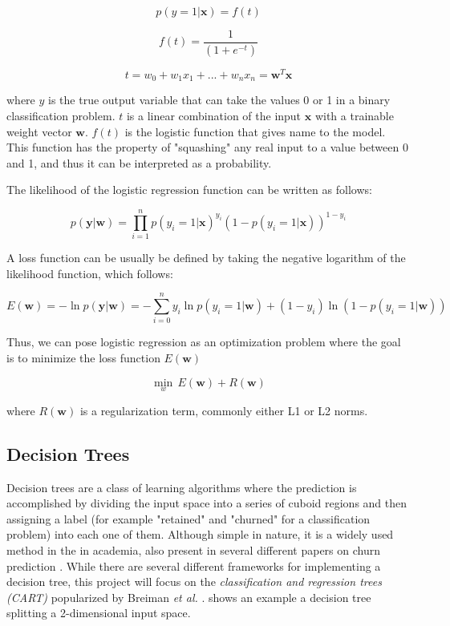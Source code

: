 \documentclass{kththesis}
\begin{document}
\begin{equation}
p(y = 1|\mathbf{x}) = f(t)
\end{equation}

\begin{equation}
f(t) = \frac{1}{(1+e^{-t})}
\end{equation}

\begin{equation}
t = w_0 + w_1x_1 + ... + w_nx_n = \mathbf{w}^T\mathbf{x}
\end{equation}

where $y$ is the true output variable that can take the values 0 or 1 in a binary classification problem. $t$ is a linear combination of the input $\bm{x}$ with a trainable weight vector $\mathbf{w}$. $f(t)$ is the logistic function that gives name to the model. This function has the property of "squashing" any real input to a value between 0 and 1, and thus it can be interpreted as a probability.

The likelihood of the logistic regression function can be written as follows:

\begin{equation}
p(\mathbf{y}|\mathbf{w}) = \prod_{i=1}^{n}  p(y_i=1|\mathbf{x})^{y_i} (1-p(y_i=1|\mathbf{x}))^{1-y_i}
\end{equation}

A loss function can be usually be defined by taking the negative logarithm of the likelihood function, which follows:

\begin{equation}
E(\mathbf{w}) = -\ln p(\mathbf{y}|\mathbf{w}) = - \sum_{i=0}^{n} y_i \ln p(y_i=1|\mathbf{w}) + (1-y_i) \ln (1 - p(y_i=1|\mathbf{w}))
\end{equation}

Thus, we can pose logistic regression as an optimization problem where the goal is to minimize the loss function $E(\mathbf{w})$ 

\begin{equation}
\displaystyle{\min_w}\, E(\mathbf{w}) + R(\mathbf{w})
\end{equation}

where $R(\mathbf{w})$ is a regularization term, commonly either L1 or L2 norms.

\subsection{Decision Trees}
Decision trees are a class of learning algorithms where the prediction is accomplished by dividing the input space into a series of cuboid regions and then assigning a label (for example "retained" and "churned" for a classification problem) into each one of them. Although simple in nature, it is a widely used method in the in academia, also present in several different papers on churn prediction \citep{Pudipeddi2014}\citep{Hassouna2015} \citep{Ballings2012} \citep{Khan2015}. While there are several different frameworks for implementing a decision tree, this project will focus on the \emph{classification and regression trees (CART)} popularized by Breiman \emph{et al.} \citep{breiman1984classification}.  shows an example a decision tree splitting a 2-dimensional input space.  
\end{document}
